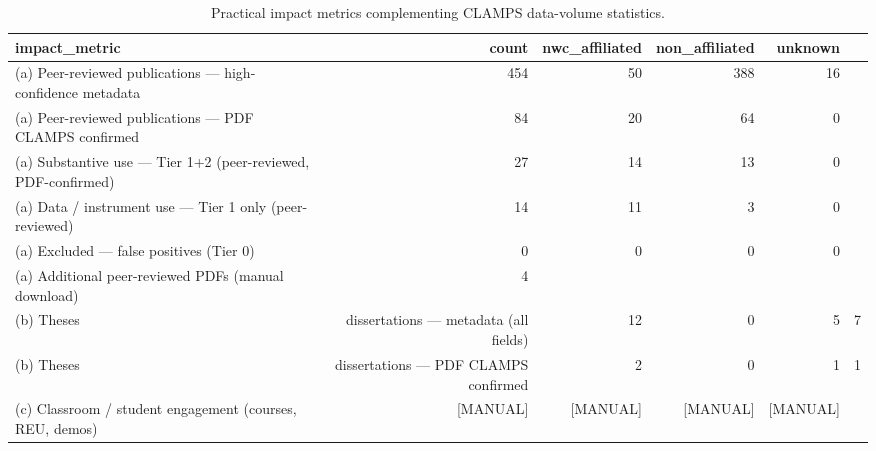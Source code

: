 \begin{table}[ht]
\centering
\caption{Practical impact metrics complementing CLAMPS data-volume statistics.}
\label{tab:impact}
\small
\begin{tabular}{lrrrr}
\hline
impact\_metric & count & nwc\_affiliated & non\_affiliated & unknown \\
\hline
(a) Peer-reviewed publications — high-confidence metadata & 454 & 50 & 388 & 16 \\
(a) Peer-reviewed publications — PDF CLAMPS confirmed & 84 & 20 & 64 & 0 \\
(a) Substantive use — Tier 1+2 (peer-reviewed, PDF-confirmed) & 27 & 14 & 13 & 0 \\
(a) Data / instrument use — Tier 1 only (peer-reviewed) & 14 & 11 & 3 & 0 \\
(a) Excluded — false positives (Tier 0) & 0 & 0 & 0 & 0 \\
(a) Additional peer-reviewed PDFs (manual download) & 4 &  &  &  \\
(b) Theses & dissertations — metadata (all fields) & 12 & 0 & 5 & 7 \\
(b) Theses & dissertations — PDF CLAMPS confirmed & 2 & 0 & 1 & 1 \\
(c) Classroom / student engagement (courses, REU, demos) & [MANUAL] & [MANUAL] & [MANUAL] & [MANUAL] \\
\hline
\end{tabular}
\end{table}